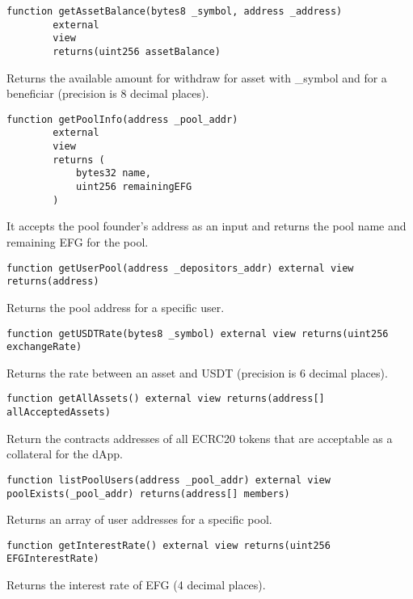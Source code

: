 \documentclass{article}
\begin{document}
\begin{lstlisting}[language=Solidity,numbers=none,escapechar=@]
  function getAssetBalance(bytes8 _symbol, address _address)
        external
        view
        returns(uint256 assetBalance)
\end{lstlisting}
Returns the available amount for withdraw for asset with \_symbol and for a beneficiar (precision is 8 decimal places).
\begin{lstlisting}[language=Solidity,numbers=none,escapechar=@]
  function getPoolInfo(address _pool_addr)
        external
        view
        returns (
            bytes32 name,
            uint256 remainingEFG
        )
\end{lstlisting}
It accepts the pool founder's address as an input and returns the pool name and remaining EFG for the pool.
\begin{lstlisting}[language=Solidity,numbers=none,escapechar=@]
 function getUserPool(address _depositors_addr) external view returns(address)
\end{lstlisting}
Returns the pool address for a specific user.

\begin{lstlisting}[language=Solidity,numbers=none,escapechar=@]
 function getUSDTRate(bytes8 _symbol) external view returns(uint256 exchangeRate)
\end{lstlisting}
Returns the rate between an asset and USDT (precision is 6 decimal places).

\begin{lstlisting}[language=Solidity,numbers=none,escapechar=@]
 function getAllAssets() external view returns(address[] allAcceptedAssets)
\end{lstlisting}
Return the contracts addresses of all ECRC20 tokens that are acceptable as a collateral for the dApp.

\begin{lstlisting}[language=Solidity,numbers=none,escapechar=@]
 function listPoolUsers(address _pool_addr) external view poolExists(_pool_addr) returns(address[] members)
\end{lstlisting}
Returns an array of user addresses for a specific pool.

\begin{lstlisting}[language=Solidity,numbers=none,escapechar=@]
 function getInterestRate() external view returns(uint256 EFGInterestRate)
\end{lstlisting}
Returns the interest rate of EFG (4 decimal places).
\end{document}
